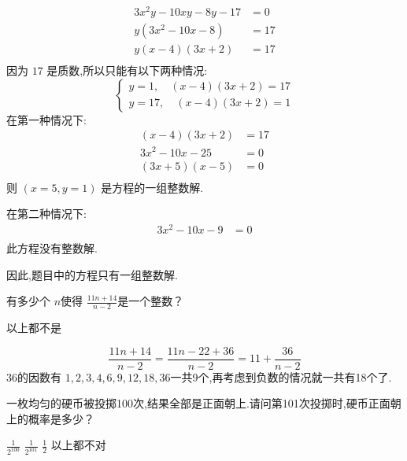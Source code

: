 \documentclass[answers]{exam}
\begin{document}
\begin{questions}
	\begin{solution}
		\begin{align*}
			3x^2y - 10xy - 8y - 17 & = 0  \\
			y(3x^2 - 10x - 8)      & = 17 \\
			y(x-4)(3x+2)           & = 17 \\
		\end{align*}
		因为 \( 17 \) 是质数,所以只能有以下两种情况:
		\begin{equation*}
			\begin{cases}
				y = 1, \quad (x-4)(3x+2) = 17 \\
				y = 17,\quad  (x-4)(3x+2) = 1
			\end{cases}
		\end{equation*}
		在第一种情况下:
		\begin{align*}
			(x-4)(3x+2)     & = 17 \\
			3x^2 -10x - 25  & = 0  \\
			(3x + 5)(x - 5) & = 0  \\
		\end{align*}
		则 \( (x=5, y=1) \) 是方程的一组整数解.

		在第二种情况下:
		\begin{align*}
			3x^2 - 10x - 9 & = 0 \\
		\end{align*}
		此方程没有整数解.

		因此,题目中的方程只有一组整数解.
	\end{solution}

	\question 有多少个 \( n \)使得 \( \displaystyle\frac{11n+14}{n-2} \)是一个整数？

	\begin{oneparchoices}
		    \choice 以上都不是
	\end{oneparchoices}

	\begin{solution}
		\begin{equation*}
			\frac{11n + 14}{n-2} = \frac{11n - 22 + 36}{n-2} = 11 + \frac{36}{n-2}
		\end{equation*}
		\( 36 \)的因数有 \( 1,2,3,4,6,9,12,18,36 \)一共9个,再考虑到负数的情况就一共有18个了.
	\end{solution}

	\question 一枚均匀的硬币被投掷100次,结果全部是正面朝上.请问第101次投掷时,硬币正面朝上的概率是多少？

	\begin{oneparchoices}
		 \choice \( \frac{1}{2^{100}} \) \choice \( \frac{1}{2^{101}} \) \CorrectChoice \( \frac{1}{2} \) \choice 以上都不对
	\end{oneparchoices}


\end{questions}
\end{document}
